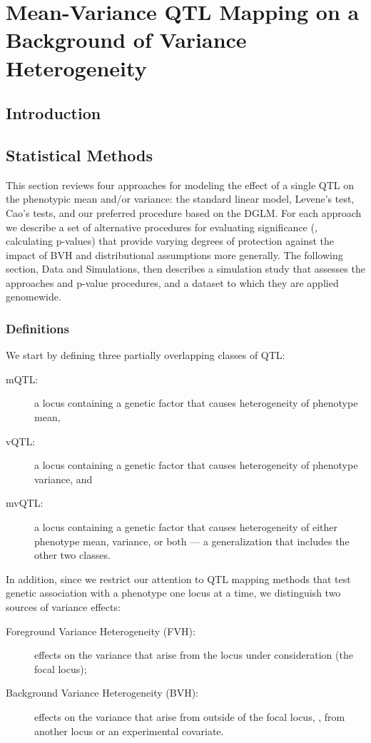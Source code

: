 \chapter{Mean-Variance QTL Mapping on a Background of Variance Heterogeneity}
\label{chap:bvh}

\section{Introduction}

\section{Statistical Methods}

This section reviews four approaches for modeling the effect of a single QTL on the phenotypic mean and/or variance: the standard linear model, Levene's test, Cao's tests, and our preferred procedure based on the DGLM. For each approach we describe a set of alternative procedures for evaluating significance (\ie, calculating p-values) that provide varying degrees of protection against the impact of BVH and distributional assumptions more generally. 
The following section, Data and Simulations, then describes a simulation study that assesses the approaches and p-value procedures, and a dataset to which they are applied genomewide.

\subsection{Definitions}

  We start by defining three partially overlapping classes of QTL:
  \begin{description}
      \item[mQTL:] a locus containing a genetic factor that causes heterogeneity of phenotype mean,
      \item[vQTL:] a locus containing a genetic factor that causes heterogeneity of phenotype variance, and
      \item[mvQTL:] a locus containing a genetic factor that causes heterogeneity of either phenotype mean, variance, or both --- a generalization that includes the other two classes.
  \end{description}
  In addition, since we restrict our attention to QTL mapping methods that test genetic association with a phenotype one locus at a time, we distinguish two sources of variance effects:
  \begin{description}
    \item[Foreground Variance Heterogeneity (FVH):] effects on the variance that arise from the locus under consideration (the focal locus);
    \item[Background Variance Heterogeneity (BVH):] effects on the variance that arise from outside of the focal locus, \eg, from another locus or an experimental covariate.
  \end{description}

